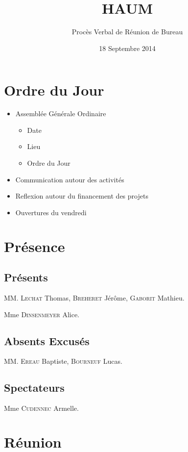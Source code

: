 \documentclass[a4paper, 11pt]{article}
\title{HAUM}
\author{Procès Verbal de Réunion de Bureau}
\date{18 Septembre 2014}
\begin{document}
	\maketitle

	\section{Ordre du Jour}

	\begin{itemize}
		\item Assemblée Générale Ordinaire
		\begin{itemize}
			\item Date
			\item Lieu
			\item Ordre du Jour
		\end{itemize}
		\item Communication autour des activités
		\item Reflexion autour du financement des projets
		\item Ouvertures du vendredi
	\end{itemize}

	\section{Présence}

	\subsection{Présents}

	MM. \textsc{Lechat} Thomas,
	\textsc{Breheret} Jérôme,
	\textsc{Gaborit} Mathieu.

	Mme \textsc{Dinsenmeyer} Alice.

	\subsection{Absents Excusés}

	MM. \textsc{Ereau} Baptiste,
	\textsc{Bourneuf} Lucas.

	\subsection{Spectateurs}

	Mme \textsc{Cudennec} Armelle.


	\section{Réunion}
\end{document}
